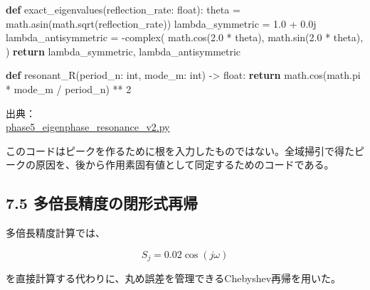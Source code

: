 \documentclass[
  10pt,
  a4paper,
]{article}
\newenvironment{Shaded}{}{}
\newcommand{\BuiltInTok}[1]{\textcolor[rgb]{0.00,0.50,0.00}{#1}}
\newcommand{\ControlFlowTok}[1]{\textcolor[rgb]{0.00,0.44,0.13}{\textbf{#1}}}
\newcommand{\DecValTok}[1]{\textcolor[rgb]{0.25,0.63,0.44}{#1}}
\newcommand{\FloatTok}[1]{\textcolor[rgb]{0.25,0.63,0.44}{#1}}
\newcommand{\KeywordTok}[1]{\textcolor[rgb]{0.00,0.44,0.13}{\textbf{#1}}}
\newcommand{\NormalTok}[1]{#1}
\newcommand{\OperatorTok}[1]{\textcolor[rgb]{0.40,0.40,0.40}{#1}}
\newcommand{\OtherTok}[1]{\textcolor[rgb]{0.00,0.44,0.13}{#1}}
\begin{document}
\begin{Shaded}
\begin{Highlighting}[]
\KeywordTok{def}\NormalTok{ exact\_eigenvalues(reflection\_rate: }\BuiltInTok{float}\NormalTok{):}
\NormalTok{    theta }\OperatorTok{=}\NormalTok{ math.asin(math.sqrt(reflection\_rate))}
\NormalTok{    lambda\_symmetric }\OperatorTok{=} \FloatTok{1.0} \OperatorTok{+} \OtherTok{0.0j}
\NormalTok{    lambda\_antisymmetric }\OperatorTok{=} \OperatorTok{{-}}\BuiltInTok{complex}\NormalTok{(}
\NormalTok{        math.cos(}\FloatTok{2.0} \OperatorTok{*}\NormalTok{ theta),}
\NormalTok{        math.sin(}\FloatTok{2.0} \OperatorTok{*}\NormalTok{ theta),}
\NormalTok{    )}
    \ControlFlowTok{return}\NormalTok{ lambda\_symmetric, lambda\_antisymmetric}


\KeywordTok{def}\NormalTok{ resonant\_R(period\_n: }\BuiltInTok{int}\NormalTok{, mode\_m: }\BuiltInTok{int}\NormalTok{) }\OperatorTok{{-}\textgreater{}} \BuiltInTok{float}\NormalTok{:}
    \ControlFlowTok{return}\NormalTok{ math.cos(math.pi }\OperatorTok{*}\NormalTok{ mode\_m }\OperatorTok{/}\NormalTok{ period\_n) }\OperatorTok{**} \DecValTok{2}
\end{Highlighting}
\end{Shaded}

出典：\\
\href{../20260717/phase5_eigenphase_resonance_v2.py\#L74-L103}{phase5\_eigenphase\_resonance\_v2.py}

このコードはピークを作るために根を入力したものではない。全域掃引で得たピークの原因を、後から作用素固有値として同定するためのコードである。

\subsection{7.5
多倍長精度の閉形式再帰}\label{ux591aux500dux9577ux7cbeux5ea6ux306eux9589ux5f62ux5f0fux518dux5e30}

多倍長精度計算では、

\[
S_j=0.02\cos(j\omega)
\]

を直接計算する代わりに、丸め誤差を管理できるChebyshev再帰を用いた。
\end{document}
